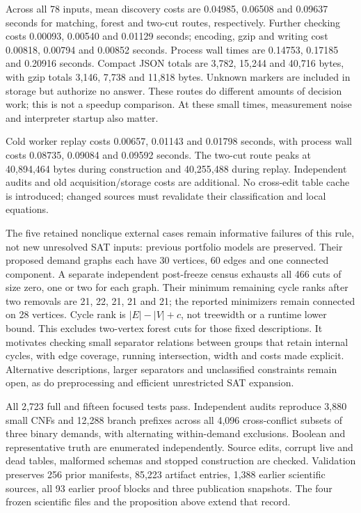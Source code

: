 Across all 78 inputs, mean discovery costs are 0.04985, 0.06508 and
0.09637 seconds for matching, forest and two-cut routes, respectively. Further
checking costs 0.00093, 0.00540 and 0.01129 seconds; encoding, gzip and writing
cost 0.00818, 0.00794 and 0.00852 seconds. Process wall times are 0.14753,
0.17185 and 0.20916 seconds. Compact JSON totals are 3,782, 15,244 and
40,716 bytes, with gzip totals 3,146, 7,738 and 11,818 bytes. Unknown markers
are included in storage but authorize no answer. These routes do different
amounts of decision work; this is not a speedup comparison. At these small
times, measurement noise and interpreter startup also matter.

Cold worker replay costs 0.00657, 0.01143 and 0.01798 seconds, with process
wall costs 0.08735, 0.09084 and 0.09592 seconds. The two-cut route peaks at
40,894,464 bytes during construction and 40,255,488 during replay.
Independent audits and old acquisition/storage costs are additional. No
cross-edit table cache is introduced; changed sources must revalidate their
classification and local equations.

The five retained nonclique external cases remain informative failures of this
rule, not new unresolved SAT inputs: previous portfolio models are preserved.
Their proposed demand graphs each have 30 vertices, 60 edges and one connected
component. A separate independent post-freeze census exhausts all 466 cuts of
size zero, one or two for each graph. Their minimum remaining cycle ranks after
two removals are 21, 22, 21, 21 and 21; the reported minimizers remain connected
on 28 vertices. Cycle rank is $|E|-|V|+c$, not treewidth or a runtime lower bound.
This excludes two-vertex forest cuts for those fixed descriptions. It motivates
checking small separator relations between groups that retain internal cycles,
with edge coverage, running intersection, width and costs made explicit.
Alternative descriptions, larger separators and unclassified constraints remain
open, as do preprocessing and efficient unrestricted SAT expansion.

All 2,723 full and fifteen focused tests pass. Independent audits reproduce
3,880 small CNFs and 12,288 branch prefixes across all 4,096 cross-conflict subsets
of three binary demands, with alternating within-demand exclusions. Boolean and
representative truth are enumerated independently. Source edits, corrupt live
and dead tables, malformed schemas and stopped construction are checked.
Validation preserves 256 prior manifests, 85,223 artifact entries, 1,388 earlier
scientific sources, all 93 earlier proof blocks and three publication snapshots.
The four frozen scientific files and the proposition above extend that record.
